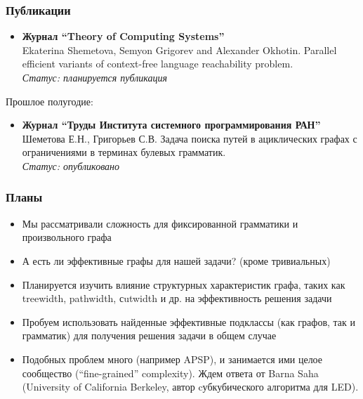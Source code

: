 \documentclass{beamer}
\begin{document}
\begin{frame}
\frametitle{Публикации}
\begin{itemize}
\item \textbf{Журнал ``Theory of Computing Systems''} \\
Ekaterina Shemetova, Semyon Grigorev and Alexander Okhotin. Parallel efficient variants of context-free language reachability problem.
\\\textit{Статус: планируется публикация}
\end{itemize}
Прошлое полугодие: 
\begin{itemize}
\item  \textbf{Журнал ``Труды Института системного программирования РАН''}
\\Шеметова Е.Н., Григорьев С.В. Задача поиска путей в ациклических графах с ограничениями в терминах булевых грамматик. 
\\\textit{Статус: опубликовано}
\end{itemize}

\end{frame}
\begin{frame}
\frametitle{Планы}
\begin{itemize}
\item Мы рассматривали сложность для фиксированной грамматики и произвольного графа
\item А есть ли эффективные графы для нашей задачи? (кроме тривиальных)
\item Планируется изучить влияние структурных характеристик графа, таких как treewidth, pathwidth, сutwidth и др. на эффективность решения задачи
\item Пробуем использовать найденные эффективные подклассы (как графов, так и грамматик) для получения решения задачи в общем случае 
\item Подобных проблем много (например APSP), и занимается ими целое сообщество (``fine-grained'' complexity). Ждем ответа от Barna Saha (University of California Berkeley, автор cубкубического алгоритма для LED).
\end{itemize}

\end{frame}
\end{document}
